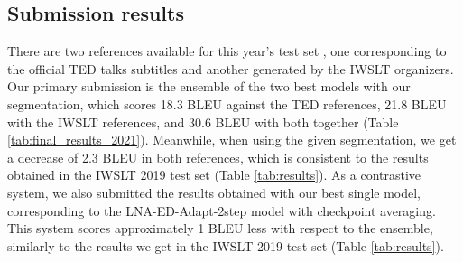 \documentclass[11pt,a4paper]{article}
\begin{document}
    \subsection{Submission results}
        \label{sec:final_results}

\begin{table}[h!]
        \centering
        \caption{Final results of our submission on the IWSLT 2020 and 2021 test sets, measured in BLEU, against the IWSLT () and TED () references separately and both at once (). With bold is our primary submission. The \textit{Single} is our best single model from Table \ref{tab:results} (LNA-ED-Adapt-2step with ckpt AVG) and the \textit{Ensemble} to the ensemble of our best single model and the LNA-ED-Adapt with In-domain FT and ckpt AVG.}
        \label{tab:final_results_2021}
    \end{table}

        There are two references available for this year's test set \cite{iwslt2021}, one corresponding to the official TED talks subtitles and another generated by the IWSLT organizers. Our primary submission is the ensemble of the two best models with our segmentation, which scores 18.3 BLEU against the TED references, 21.8 BLEU with the IWSLT references, and 30.6 BLEU with both together (Table \ref{tab:final_results_2021}). Meanwhile, when using the given segmentation, we get a decrease of 2.3 BLEU in both references, which is consistent to the results obtained in the IWSLT 2019 test set (Table \ref{tab:results}). As a contrastive system, we also submitted the results obtained with our best single model, corresponding to the LNA-ED-Adapt-2step model with checkpoint averaging. This system scores approximately 1 BLEU less with respect to the ensemble, similarly to the results we get in the IWSLT 2019 test set (Table \ref{tab:results}).
        
\end{document}

